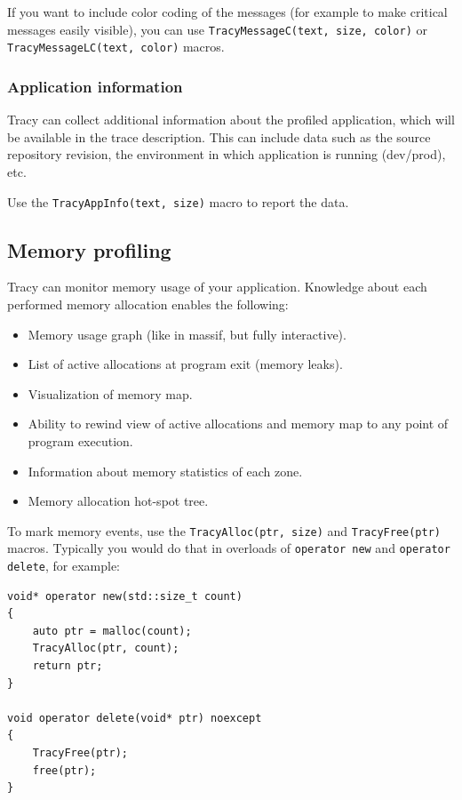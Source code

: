 \documentclass[hidelinks,titlepage,a4paper]{article}
\begin{document}
If you want to include color coding of the messages (for example to make critical messages easily visible), you can use \texttt{TracyMessageC(text, size, color)} or \texttt{TracyMessageLC(text, color)} macros.

\subsubsection{Application information}
\label{appinfo}

Tracy can collect additional information about the profiled application, which will be available in the trace description. This can include data such as the source repository revision, the environment in which application is running (dev/prod), etc.

Use the \texttt{TracyAppInfo(text, size)} macro to report the data.

\subsection{Memory profiling}
\label{memoryprofiling}

Tracy can monitor memory usage of your application. Knowledge about each performed memory allocation enables the following:

\begin{itemize}
\item Memory usage graph (like in massif, but fully interactive).
\item List of active allocations at program exit (memory leaks).
\item Visualization of memory map.
\item Ability to rewind view of active allocations and memory map to any point of program execution.
\item Information about memory statistics of each zone.
\item Memory allocation hot-spot tree.
\end{itemize}

To mark memory events, use the \texttt{TracyAlloc(ptr, size)} and \texttt{TracyFree(ptr)} macros. Typically you would do that in overloads of \texttt{operator new} and \texttt{operator delete}, for example:

\begin{lstlisting}
void* operator new(std::size_t count)
{
    auto ptr = malloc(count);
    TracyAlloc(ptr, count);
    return ptr;
}

void operator delete(void* ptr) noexcept
{
    TracyFree(ptr);
    free(ptr);
}
\end{lstlisting}
\end{document}
